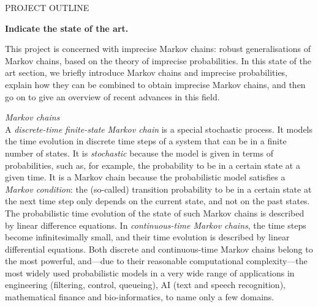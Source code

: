 \documentclass[11pt,dvipsnames,usenames,a4paper]{article}
\begin{document}
\newpage
{}

\setcounter{page}{1}

\begin{shaded}\centering PROJECT OUTLINE \end{shaded}


\textbf{Indicate the state of the art.}

This project is concerned with imprecise Markov chains: robust generalisations of Markov chains, based on the theory of imprecise probabilities. 
In this state of the art section, we briefly introduce Markov chains and imprecise probabilities, explain how they can be combined to obtain imprecise Markov chains, and then go on to give an overview of recent advances in this field.

\emph{Markov chains}\\[5pt]
A \emph{discrete-time} \emph{finite-state} \emph{Markov chain} is a special stochastic process. 
It models the time evolution in discrete time steps of a system that can be in a finite number of states.
It is \emph{stochastic} because the model is given in terms of probabilities, such as, for example, the probability to be in a certain state at a given time.
It is a Markov chain because the probabilistic model satisfies a \emph{Markov condition}: the (so-called) transition probability to be in a certain state at the next time step only depends on the current state, and not on the past states.
The probabilistic time evolution of the state of such Markov chains is described by linear difference equations.
In \emph{continuous-time Markov chains}, the time steps become infinitesimally small, and their time evolution is described by linear differential equations. 
Both discrete and continuous-time Markov chains belong to the most powerful, and---due to their reasonable computational complexity---the most widely used probabilistic models in a very wide range of applications in engineering (filtering, control, queueing), AI (text and speech recognition), mathematical finance and bio-informatics, to name only a few domains.
\end{document}

